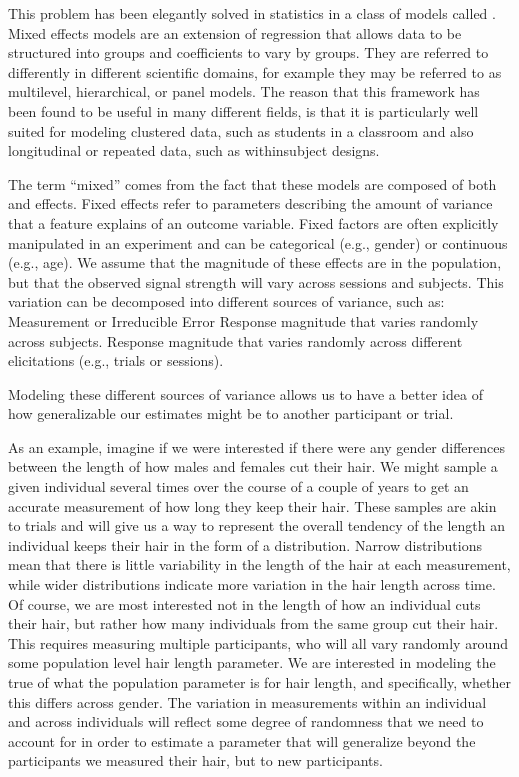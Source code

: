 \documentclass[letterpaper,10pt,english]{sphinxmanual}
\begin{document}
This problem has been elegantly solved in statistics in a class of models called . Mixed effects models are an extension of regression that allows data to be structured into groups and coefficients to vary by groups. They are referred to differently in different scientific domains, for example they may be referred to as multilevel, hierarchical, or panel models. The reason that this framework has been found to be useful in many different fields, is that it is particularly well suited for modeling clustered data, such as students in a classroom and also longitudinal or repeated data, such as within\sphinxhyphen{}subject designs.

The term “mixed” comes from the fact that these models are composed of both  and  effects. Fixed effects refer to parameters describing the amount of variance that a feature explains of an outcome variable. Fixed factors are often explicitly manipulated in an experiment and can be categorical (e.g., gender) or continuous (e.g., age). We assume that the magnitude of these effects are  in the population, but that the observed signal strength will vary across sessions and subjects. This variation can be decomposed into different sources of variance, such as:
\sphinxhyphen{} Measurement or Irreducible Error
\sphinxhyphen{} Response magnitude that varies randomly across subjects.
\sphinxhyphen{} Response magnitude that varies randomly across different elicitations (e.g., trials or sessions).

Modeling these different sources of variance allows us to have a better idea of how generalizable our estimates might be to another participant or trial.

As an example, imagine if we were interested if there were any gender differences between the length of how males and females cut their hair. We might sample a given individual several times over the course of a couple of years to get an accurate measurement of how long they keep their hair. These samples are akin to trials and will give us a way to represent the overall tendency of the length an individual keeps their hair in the form of a distribution. Narrow distributions mean that there is little variability in the length of the hair at each measurement, while wider distributions indicate more variation in the hair length across time. Of course, we are most interested not in the length of how an individual cuts their hair, but rather how many individuals from the same group cut their hair. This requires measuring multiple participants, who will all vary randomly around some population level hair length parameter. We are interested in modeling the true  of what the population parameter is for hair length, and specifically, whether this differs across gender. The variation in measurements within an individual and across individuals will reflect some degree of randomness that we need to account for in order to estimate a parameter that will generalize beyond the participants we measured their hair, but to new participants.
\end{document}
